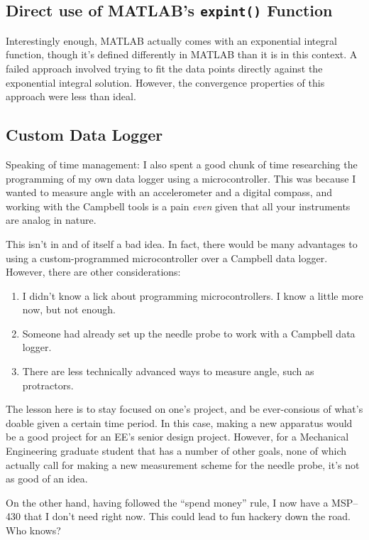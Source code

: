 \subsection{Direct use of MATLAB's \texttt{expint()} Function}

Interestingly enough, MATLAB actually comes with an exponential integral
function, though it's defined differently in MATLAB than it is in this
context. A failed approach involved trying to fit the data points
directly against the exponential integral solution. However, the
convergence properties of this approach were less than ideal.

\subsection{Custom Data Logger}

Speaking of time management: I also spent a good chunk of time
researching the programming of my own data logger using a
microcontroller. This was because I wanted to measure angle with an
accelerometer and a digital compass, and working with the Campbell tools
is a pain \emph{even} given that all your instruments are analog in
nature.

This isn't in and of itself a bad idea. In fact, there would be many
advantages to using a custom-programmed microcontroller over a Campbell
data logger. However, there are other considerations:

\begin{enumerate}
\item I didn't know a lick about programming microcontrollers. I know a
  little more now, but not enough.
\item Someone had already set up the needle probe to work with a Campbell
  data logger.
\item There are less technically advanced ways to measure angle, such as
  protractors.
\end{enumerate}
The lesson here is to stay focused on one's project, and be
ever-consious of what's doable given a certain time period. In this
case, making a new apparatus would be a good project for an EE's senior
design project. However, for a Mechanical Engineering graduate student
that has a number of other goals, none of which actually call for making
a new measurement scheme for the needle probe, it's not as good of an
idea.

On the other hand, having followed the ``spend money'' rule, I now have
a MSP--430 that I don't need right now. This could lead to fun hackery
down the road. Who knows?

